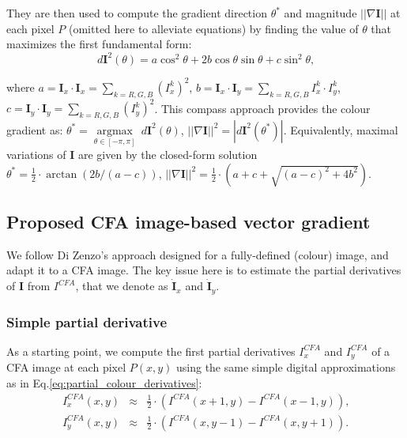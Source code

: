 \documentclass[twoside]{article}
\begin{document}
\noindent They are then used to compute the gradient direction $\theta^{*}$ and magnitude $||\nabla \mathbf{I}||$ at each pixel $P$ (omitted here to alleviate equations) by finding the value of $\theta$ that maximizes the first fundamental form:
\begin{equation}\label{eq:dI^2}
d \textbf{I}^2(\theta)= a \cos^2 \theta + 2 b\cos \theta \sin \theta + c \sin^2 \theta \text{,}
\end{equation}

\noindent where $a = \textbf{I}_x \cdot \textbf{I}_x = \sum_{k=R,G,B} (I^k_x)^2$, $b = \textbf{I}_x \cdot \textbf{I}_y = \sum_{k=R,G,B} I^k_x \cdot I^k_y$, $c = \textbf{I}_y \cdot \textbf{I}_y = \sum_{k=R,G,B} (I^k_y)^2$. This compass approach provides the colour gradient as: $\theta^{*} = \underset{\theta \in [-\pi,\pi]}{\operatorname{argmax}}~d \textbf{I}^2(\theta)$, $||\nabla \mathbf{I}||^2 = \left| d \textbf{I}^2( \theta^{*}) \right|$. Equivalently, maximal variations of $\mathbf{I}$ are given by the closed-form solution $\theta^{*} = \frac{1}{2} \cdot \arctan \left( 2b / (a-c) \right)$, $||\nabla \mathbf{I}||^2=\frac{1}{2} \cdot \left( a + c+ \sqrt{(a-c)^2+4b^2} \right)$. 



\subsection{Proposed CFA image-based vector gradient}
\label{subsec:cfa_gradient}

We follow Di Zenzo's approach designed for a fully-defined (colour) image, and adapt it to a CFA image. The key issue here is to estimate the partial derivatives of $\mathbf{I}$ from $I^{CFA}$, that we denote as $\dot{\textbf{I}}_x$ and $\dot{\textbf{I}}_y$.


\subsubsection{Simple partial derivative}

As a starting point, we compute the first partial derivatives $I_x^{CFA}$ and $I_y^{CFA}$ of a CFA image at each pixel $P(x,y)$ using the same simple digital approximations as in Eq.\eqref{eq:partial_colour_derivatives}:
\begin{equation}
	\begin{array}{rcl}
		I^{CFA}_x(x,y) &\approx& \frac{1}{2} \cdot \left( I^{CFA}(x+1,y) - I^{CFA}(x-1,y) \right) \text{,} \\
		I^{CFA}_y(x,y) &\approx& \frac{1}{2} \cdot \left( I^{CFA}(x,y-1) - I^{CFA}(x,y+1) \right) \text{.}
	\end{array}
\label{eq:partial_cfa_derivatives}
\end{equation}
\end{document}
